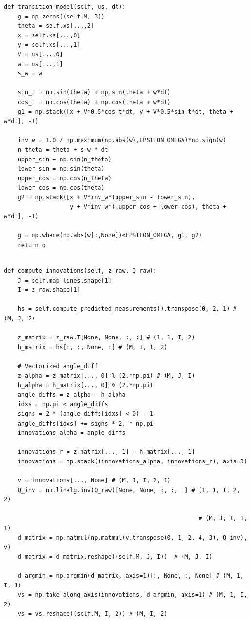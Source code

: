 \documentclass{article}
\begin{document}
\begin{enumerate}[label=(\roman*)]
\begin{verbatim}
def transition_model(self, us, dt):
    g = np.zeros((self.M, 3))
    theta = self.xs[...,2]
    x = self.xs[...,0]
    y = self.xs[...,1]
    V = us[...,0]
    w = us[...,1]
    s_w = w

    sin_t = np.sin(theta) + np.sin(theta + w*dt)
    cos_t = np.cos(theta) + np.cos(theta + w*dt)
    g1 = np.stack([x + V*0.5*cos_t*dt, y + V*0.5*sin_t*dt, theta + w*dt], -1)

    inv_w = 1.0 / np.maximum(np.abs(w),EPSILON_OMEGA)*np.sign(w)
    n_theta = theta + s_w * dt
    upper_sin = np.sin(n_theta)
    lower_sin = np.sin(theta)
    upper_cos = np.cos(n_theta)
    lower_cos = np.cos(theta)
    g2 = np.stack([x + V*inv_w*(upper_sin - lower_sin), 
                   y + V*inv_w*(-upper_cos + lower_cos), theta + w*dt], -1)

    g = np.where(np.abs(w[:,None])<EPSILON_OMEGA, g1, g2)
    return g
\end{verbatim}
\newpage
\begin{verbatim}
        
def compute_innovations(self, z_raw, Q_raw):
    J = self.map_lines.shape[1]
    I = z_raw.shape[1]

    hs = self.compute_predicted_measurements().transpose(0, 2, 1) # (M, J, 2)

    z_matrix = z_raw.T[None, None, :, :] # (1, 1, I, 2)
    h_matrix = hs[:, :, None, :] # (M, J, 1, 2)
    
    # Vectorized angle_diff
    z_alpha = z_matrix[..., 0] % (2.*np.pi) # (M, J, I)
    h_alpha = h_matrix[..., 0] % (2.*np.pi)
    angle_diffs = z_alpha - h_alpha 
    idxs = np.pi < angle_diffs
    signs = 2 * (angle_diffs[idxs] < 0) - 1
    angle_diffs[idxs] += signs * 2. * np.pi
    innovations_alpha = angle_diffs

    innovations_r = z_matrix[..., 1] - h_matrix[..., 1]
    innovations = np.stack((innovations_alpha, innovations_r), axis=3)

    v = innovations[..., None] # (M, J, I, 2, 1)
    Q_inv = np.linalg.inv(Q_raw)[None, None, :, :, :] # (1, 1, I, 2, 2)
    
                                                        # (M, J, I, 1, 1)
    d_matrix = np.matmul(np.matmul(v.transpose(0, 1, 2, 4, 3), Q_inv), v) 
    d_matrix = d_matrix.reshape((self.M, J, I))  # (M, J, I)

    d_argmin = np.argmin(d_matrix, axis=1)[:, None, :, None] # (M, 1, I, 1)
    vs = np.take_along_axis(innovations, d_argmin, axis=1) # (M, 1, I, 2)
    vs = vs.reshape((self.M, I, 2)) # (M, I, 2)


\end{verbatim}
\end{enumerate}
\end{document}
